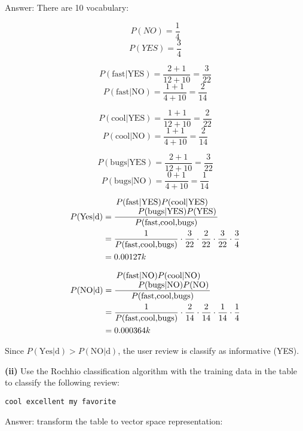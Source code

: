 \documentclass[11pt,a4paper]{report}
\begin{document}
\begin{multicols*}{2}
\noindent Answer: There are 10 vocabulary:

$$P(NO) = \frac{1}{4}$$
$$P(YES) = \frac{3}{4}$$

$$P(\text{fast}|\text{YES}) = \frac{2 + 1}{12 + 10} = \frac{3}{22}$$
$$P(\text{fast}|\text{NO}) = \frac{1 + 1}{4 + 10} = \frac{2}{14}$$

$$P(\text{cool}|\text{YES}) = \frac{1 + 1}{12 + 10} = \frac{2}{22}$$
$$P(\text{cool}|\text{NO}) = \frac{1 + 1}{4 + 10} = \frac{2}{14}$$

$$P(\text{bugs}|\text{YES}) = \frac{2 + 1}{12 + 10} = \frac{3}{22}$$
$$P(\text{bugs}|\text{NO}) = \frac{0 + 1}{4 + 10} = \frac{1}{14}$$

\begin{equation*}
\begin{split}
P(\text{Yes}|\text{d}) &= \frac{\splitfrac{P(\text{fast}|\text{YES})P(\text{cool}|\text{YES})}{P(\text{bugs}|\text{YES})P(\text{YES})}}{P(\text{fast,cool,bugs})}\\
&= \frac{1}{P(\text{fast,cool,bugs})} \cdot \frac{3}{22} \cdot \frac{2}{22} \cdot \frac{3}{22} \cdot \frac{3}{4}\\
&= 0.00127k
\end{split}
\end{equation*}

\begin{equation*}
\begin{split}
P(\text{NO}|\text{d}) &= \frac{\splitfrac{P(\text{fast}|\text{NO})P(\text{cool}|\text{NO})}{P(\text{bugs}|\text{NO})P(\text{NO})}}{P(\text{fast,cool,bugs})}\\
&= \frac{1}{P(\text{fast,cool,bugs})} \cdot \frac{2}{14} \cdot \frac{2}{14} \cdot \frac{1}{14} \cdot \frac{1}{4}\\
&= 0.000364k
\end{split}
\end{equation*}

\noindent Since $P(\text{Yes}|\text{d}) > P(\text{NO}|\text{d})$, the user review is classify as informative (YES). 

\noindent \textbf{(ii)} Use the Rochhio classification algorithm with the training data in the table to classify the following review:
\begin{center}\verb|cool excellent my favorite|\end{center}

\noindent Answer: transform the table to vector space representation:


\end{multicols*}
\end{document}
